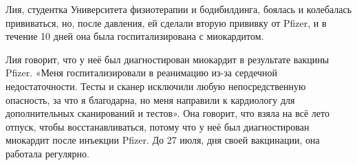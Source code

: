 Лия, студентка Университета физиотерапии и бодибилдинга, боялась и колебалась
прививаться, но, после давления, ей сделали вторую прививку от Pfizer, и в
течение 10 дней она была госпитализирована с миокардитом.

Лия говорит, что у неё был диагностирован миокардит в результате вакцины
Pfizer. «Меня госпитализировали в реанимацию из-за сердечной
недостаточности. Тесты и сканер исключили любую непосредственную опасность, за
что я благодарна, но меня направили к кардиологу для дополнительных сканирований
и тестов». Она говорит, что взяла на всё лето отпуск, чтобы восстанавливаться,
потому что у неё был диагностирован миокардит после инъекции Pfizer. До 27 июля,
дня своей вакцинации, она работала регулярно.

